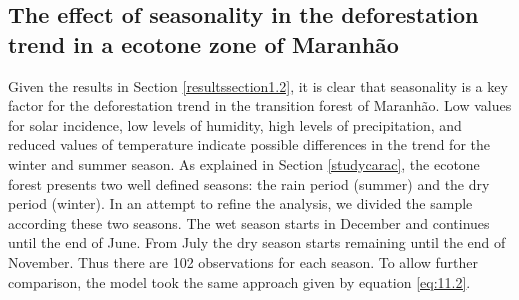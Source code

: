 


\subsection{The effect of seasonality in the deforestation trend in a ecotone zone of Maranhão} \label{resultssection2.2}

Given the results in Section \ref{resultssection1.2}, it is clear that seasonality is a key factor for the deforestation trend in the transition forest of Maranhão. Low values for solar incidence, low levels of humidity, high levels of precipitation, and reduced values of temperature indicate possible differences in the trend for the winter and summer season. As explained in Section \ref{studycarac}, the ecotone forest presents two well defined seasons: the rain period (summer) and the dry period (winter). In an attempt to refine the analysis, we divided the sample according these two seasons. The wet season starts in December and continues until the end of June. From July the dry season starts remaining until the end of November. Thus there are 102 observations for each season. To allow further comparison, the model took the same approach given by equation \ref{eq:11.2}. 

